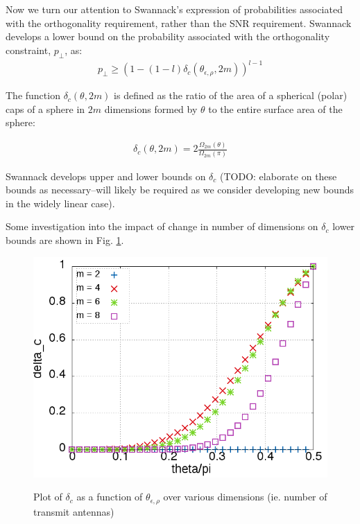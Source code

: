 Now we turn our attention to Swannack's expression of probabilities associated with the orthogonality requirement, rather than the SNR requirement. Swannack develops a lower bound on the probability associated with the orthogonality constraint, $p_\perp$, as:
\begin{equation}\label{eq:p_perp}
    \begin{aligned}
        p_\perp \geq (1-(1-l)\delta_c(\theta_{\epsilon,\rho},2m))^{l-1}
    \end{aligned}
\end{equation}

The function $\delta_c(\theta,2m)$ is defined as the ratio of the area of a spherical (polar) caps of a sphere in $2m$ dimensions formed by $\theta$ to the entire surface area of the sphere:

\begin{equation}\label{eq:delta_c_sphere}
    \begin{aligned}
        \delta_c(\theta,2m) = 2\frac{\Omega_{2m}(\theta)}{\Omega_{2m}(\pi)}
    \end{aligned}
\end{equation}

Swannack develops upper and lower bounds on $\delta_c$ (TODO: elaborate on these bounds as necessary--will likely be required as we consider developing new bounds in the widely linear case).

Some investigation into the impact of change in number of dimensions on $\delta_c$ lower bounds are shown in Fig. \ref{fig:delta}.
\begin{figure}
    \includegraphics[width=12cm]{figs/delta.png}\\
    \caption{Plot of $\delta_c$ as a function of $\theta_{\epsilon,\rho}$ over various dimensions (ie. number of transmit antennas)}
    \label{fig:delta}
\end{figure}

